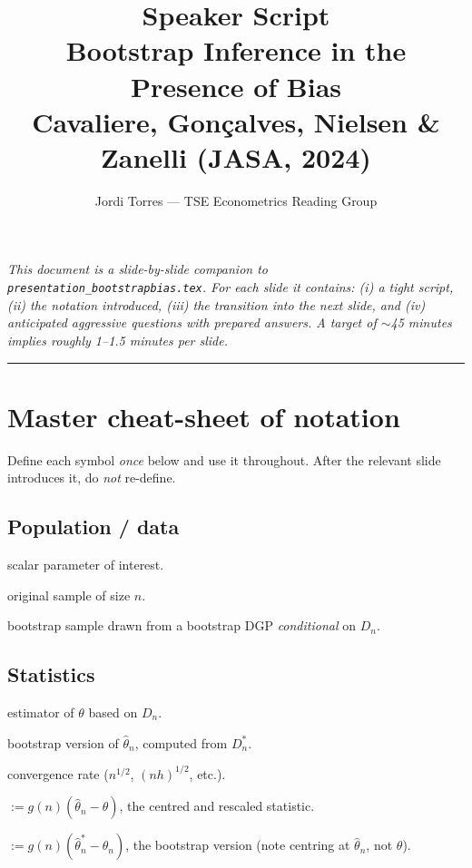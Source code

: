 \documentclass[11pt]{article}
\title{\color{accent}\bfseries Speaker Script\\
\large Bootstrap Inference in the Presence of Bias\\
\normalsize\mdseries Cavaliere, Gonçalves, Nielsen \& Zanelli (JASA, 2024)}
\author{Jordi Torres --- TSE Econometrics Reading Group}
\date{}
\theoremstyle{definition}
\newcommand{\R}{\mathbb{R}}
\newcommand{\Tn}{T_{n}}
\newcommand{\Tns}{T_{n}^{*}}
\newcommand{\thn}{\hat{\theta}_{n}}
\newcommand{\thns}{\hat{\theta}_{n}^{*}}
\newcommand{\Dn}{D_{n}}
\newcommand{\Dns}{D_{n}^{*}}
\begin{document}
\maketitle
\thispagestyle{empty}

\noindent\textit{This document is a slide-by-slide companion to
\texttt{presentation\_bootstrapbias.tex}. For each slide it contains:
(i) a tight script, (ii) the notation introduced, (iii) the transition into
the next slide, and (iv) anticipated aggressive questions with prepared answers.
A target of $\sim$45 minutes implies roughly 1--1.5 minutes per slide.}

\bigskip
\hrule
\bigskip

\section{Master cheat-sheet of notation}

Define each symbol \emph{once} below and use it throughout. After the relevant
slide introduces it, do \emph{not} re-define.

\subsection*{Population / data}
\begin{description}[leftmargin=2.6cm,style=nextline]
  \item[$\theta\in\R$] scalar parameter of interest.
  \item[$\Dn$] original sample of size $n$.
  \item[$\Dns$] bootstrap sample drawn from a bootstrap DGP \emph{conditional} on $\Dn$.
\end{description}

\subsection*{Statistics}
\begin{description}[leftmargin=2.6cm,style=nextline]
  \item[$\thn$] estimator of $\theta$ based on $\Dn$.
  \item[$\thns$] bootstrap version of $\thn$, computed from $\Dns$.
  \item[$g(n)$] convergence rate ($n^{1/2}$, $(nh)^{1/2}$, etc.).
  \item[$\Tn$] $:= g(n)(\thn-\theta)$, the centred and rescaled statistic.
  \item[$\Tns$] $:= g(n)(\thns-\thn)$, the bootstrap version
    (note centring at $\thn$, not $\theta$).
\end{description}
\end{document}

